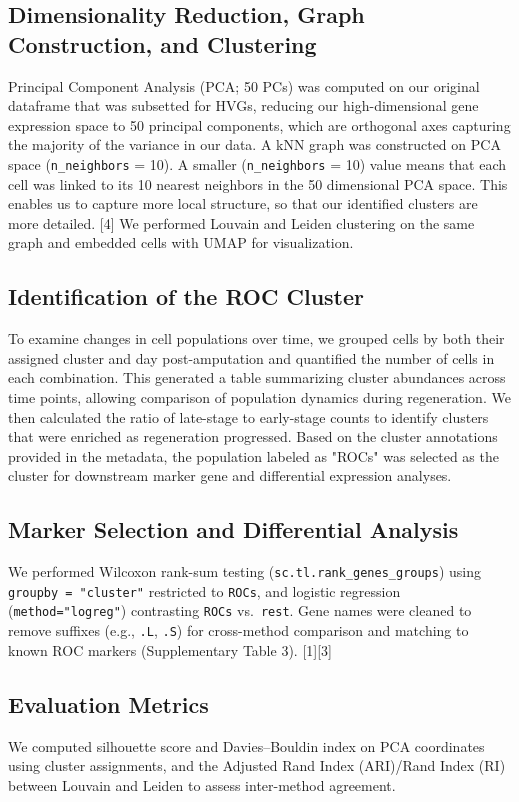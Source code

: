 \documentclass[11pt]{article}
\begin{document}
\subsection{Dimensionality Reduction, Graph Construction, and Clustering}
Principal Component Analysis (PCA; 50 PCs) was computed on our original dataframe that was subsetted for HVGs, reducing our high-dimensional gene expression space to 50 principal components, which are orthogonal axes capturing the majority of the variance in our data. A kNN graph was constructed on PCA space (\texttt{n\_neighbors} = 10). A smaller (\texttt{n\_neighbors} = 10) value means that each cell was linked to its 10 nearest  neighbors in the 50 dimensional PCA space. This enables us to capture more local structure, so that our identified clusters are more detailed. [4] We performed Louvain and Leiden clustering on the same graph and embedded cells with UMAP for visualization.

\subsection{Identification of the ROC Cluster}
To examine changes in cell populations over time, we grouped cells by both their assigned cluster and day post-amputation and quantified the number of cells in each combination. This generated a table summarizing cluster abundances across time points, allowing comparison of population dynamics during regeneration. We then calculated the ratio of late-stage to early-stage counts to identify clusters that were enriched as regeneration progressed. Based on the cluster annotations provided in the metadata, the population labeled as "ROCs" was selected as the cluster for downstream marker gene and differential expression analyses. 

\subsection{Marker Selection and Differential Analysis}
We performed Wilcoxon rank-sum testing (\texttt{sc.tl.rank\_genes\_groups}) using \texttt{groupby = "cluster"} restricted to \texttt{ROCs}, and logistic regression (\texttt{method="logreg"}) contrasting \texttt{ROCs} vs.\ \texttt{rest}. Gene names were cleaned to remove suffixes (e.g., \texttt{.L}, \texttt{.S}) for cross-method comparison and matching to known ROC markers (Supplementary Table 3). [1][3]

\subsection{Evaluation Metrics}
We computed silhouette score and Davies--Bouldin index on PCA coordinates using cluster assignments, and the Adjusted Rand Index (ARI)/Rand Index (RI) between Louvain and Leiden to assess inter-method agreement. 
\end{document}
